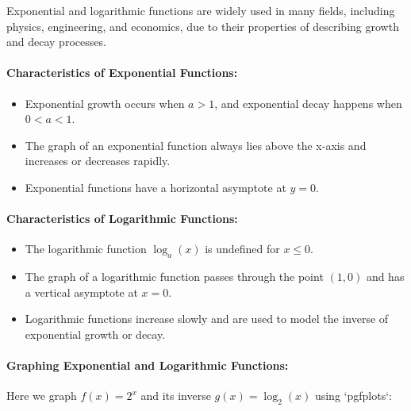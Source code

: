 \documentclass[a4paper,12pt]{book}
\begin{document}
Exponential and logarithmic functions are widely used in many fields, including physics, engineering, and economics, due to their properties of describing growth and decay processes.

\paragraph{Characteristics of Exponential Functions:}
\begin{itemize}
    \item Exponential growth occurs when \( a > 1 \), and exponential decay happens when \( 0 < a < 1 \).
    \item The graph of an exponential function always lies above the x-axis and increases or decreases rapidly.
    \item Exponential functions have a horizontal asymptote at \( y = 0 \).
\end{itemize}

\paragraph{Characteristics of Logarithmic Functions:}
\begin{itemize}
    \item The logarithmic function \( \log_a(x) \) is undefined for \( x \leq 0 \).
    \item The graph of a logarithmic function passes through the point \( (1, 0) \) and has a vertical asymptote at \( x = 0 \).
    \item Logarithmic functions increase slowly and are used to model the inverse of exponential growth or decay.
\end{itemize}

\paragraph{Graphing Exponential and Logarithmic Functions:}
Here we graph \( f(x) = 2^x \) and its inverse \( g(x) = \log_2(x) \) using `pgfplots`:

\end{document}
